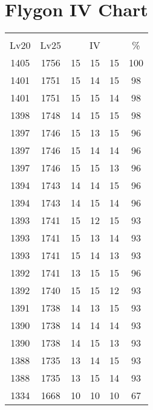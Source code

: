 \documentclass{article}%
\begin{document}
%
\normalsize%
\section{Flygon IV Chart}%
\label{sec:Flygon IV Chart}%
\renewcommand{\arraystretch}{1.5}%
\begin{tabular}{|c|c|c|c|c|c|}%
\hline%
\multicolumn{6}{|c|}{\textcolor{white}{ 
\linebreak{Flygon}
}%
\cellcolor{black}}\\%
\multicolumn{1}{|c}{Lv20}&\multicolumn{1}{c|}{Lv25}&\multicolumn{3}{c|}{IV}&\multicolumn{1}{|c|}{\%}\\%
\hline%
\rowcolor{color100}%
1405&1756&15&15&15&100\\%
\hline%
\rowcolor{color98}%
1401&1751&15&14&15&98\\%
\hline%
\rowcolor{color98}%
1401&1751&15&15&14&98\\%
\hline%
\rowcolor{color98}%
1398&1748&14&15&15&98\\%
\hline%
\rowcolor{color96}%
1397&1746&15&13&15&96\\%
\hline%
\rowcolor{color96}%
1397&1746&15&14&14&96\\%
\hline%
\rowcolor{color96}%
1397&1746&15&15&13&96\\%
\hline%
\rowcolor{color96}%
1394&1743&14&14&15&96\\%
\hline%
\rowcolor{color96}%
1394&1743&14&15&14&96\\%
\hline%
\rowcolor{color93}%
1393&1741&15&12&15&93\\%
\hline%
\rowcolor{color93}%
1393&1741&15&13&14&93\\%
\hline%
\rowcolor{color93}%
1393&1741&15&14&13&93\\%
\hline%
\rowcolor{color96}%
1392&1741&13&15&15&96\\%
\hline%
\rowcolor{color93}%
1392&1740&15&15&12&93\\%
\hline%
\rowcolor{color93}%
1391&1738&14&13&15&93\\%
\hline%
\rowcolor{color93}%
1390&1738&14&14&14&93\\%
\hline%
\rowcolor{color93}%
1390&1738&14&15&13&93\\%
\hline%
\rowcolor{color93}%
1388&1735&13&14&15&93\\%
\hline%
\rowcolor{color93}%
1388&1735&13&15&14&93\\%
\hline%
\rowcolor{color91}%
1334&1668&10&10&10&67\\%
\end{tabular}

%
\end{document}
